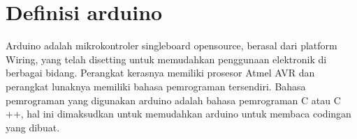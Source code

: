 \section{Definisi arduino}
Arduino adalah mikrokontroler singleboard opensource, berasal dari platform Wiring, yang telah disetting untuk memudahkan penggunaan elektronik di berbagai bidang. Perangkat kerasnya memiliki prosesor Atmel AVR dan perangkat lunaknya memiliki bahasa pemrograman tersendiri. Bahasa pemrograman yang digunakan arduino adalah bahasa pemrograman C atau C ++, hal ini dimaksudkan untuk memudahkan arduino untuk membaca codingan yang dibuat.